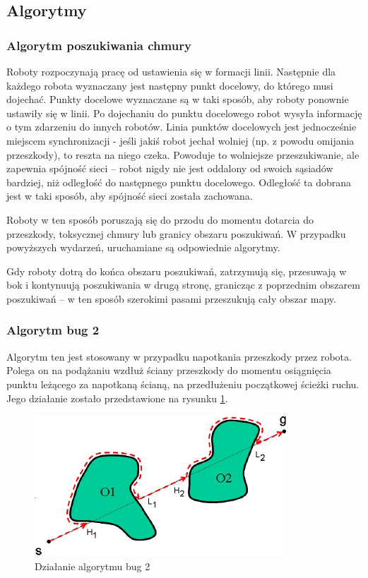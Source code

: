 \documentclass[a4paper, 12pt]{article}
\begin{document}
	
	\subsection{Algorytmy}
		
		\subsubsection{Algorytm poszukiwania chmury}
		Roboty rozpoczynają pracę od ustawienia się w formacji linii. Następnie dla każdego robota wyznaczany jest następny punkt docelowy, do którego musi dojechać. Punkty docelowe wyznaczane są w taki sposób, aby roboty ponownie ustawiły się w linii. Po dojechaniu do punktu docelowego robot wysyła informację o tym zdarzeniu do innych robotów. Linia punktów docelowych jest jednocześnie miejscem synchronizacji - jeśli jakiś robot jechał wolniej (np. z powodu omijania przeszkody), to reszta na niego czeka. Powoduje to wolniejsze przeszukiwanie, ale zapewnia spójność sieci -- robot nigdy nie jest oddalony od swoich sąsiadów bardziej, niż odległość do następnego punktu docelowego. Odległość ta dobrana jest w taki sposób, aby spójność sieci została zachowana.
		
		Roboty w ten sposób poruszają się do przodu do momentu dotarcia do przeszkody, toksycznej chmury lub granicy obszaru poszukiwań. W przypadku powyższych wydarzeń, uruchamiane są odpowiednie algorytmy.
		
		Gdy roboty dotrą do końca obszaru poszukiwań, zatrzymują się, przesuwają w bok i kontynuują poszukiwania w drugą stronę, granicząc z poprzednim obszarem poszukiwań -- w ten sposób szerokimi pasami przeszukują cały obszar mapy.
		
		\subsubsection{Algorytm bug 2}
		Algorytm ten jest stosowany w przypadku napotkania przeszkody przez robota. Polega on na podążaniu wzdłuż ściany przeszkody do momentu osiągnięcia punktu leżącego za napotkaną ścianą, na przedłużeniu początkowej ścieżki ruchu. Jego działanie zostało przedstawione na rysunku \ref{bug2_img}.
		\begin{figure}[h!]
			\centering
			\includegraphics*[width=0.7\columnwidth]{img/40-0.png}
			\caption{Działanie algorytmu bug 2}
			\label{bug2_img}
		\end{figure}
\end{document}
